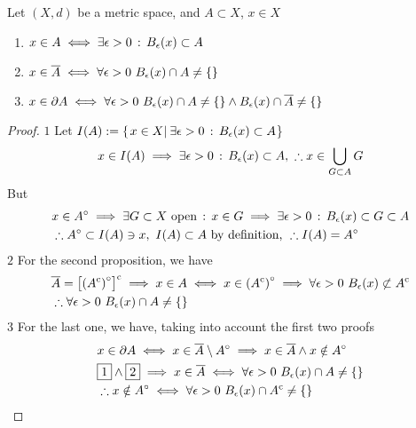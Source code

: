 \documentclass[../complete.tex]{subfiles}
\begin{document}
\begin{prop}
	Let $(X,d)$ be a metric space, and $A\subset X$, $x\in X$
	\begin{enumerate}
	\item $x\in A\iff\exists\epsilon>0\, :\,  B_\epsilon(x)\subset A$
	\item $x\in\cc{A}\iff\forall\epsilon>0\ B_\epsilon(x)\cap A\ne\{\}$
	\item $x\in\partial A\iff\forall\epsilon>0\ B_\epsilon(x)\cap A\ne\{\}\wedge B_\epsilon(x)\cap\overline{A}\ne\{\}$
	\end{enumerate}
\end{prop}
\begin{proof}
		$\boxed{1}$ Let $I(A):=\{\left.x\in X\right|_{}\exists\epsilon>0\, :\,  B_\epsilon(x)\subset A$\}\\
		\begin{equation*}
			x\in I(A)\implies\exists\epsilon>0\, :\,  B_\epsilon(x)\subset A,\ \therefore x\in\bigcup_{G\subset A}G
		\end{equation*}
		But
		\begin{equation*}
			\begin{aligned}
				&x\in A^{\circ}\implies\exists G\subset X\text{ open}\, :\,  x\in G\implies\exists\epsilon>0\, :\,  B_\epsilon(x)\subset G\subset A\\
				&\therefore A^{\circ}\subset I(A)\ni x,\ I(A)\subset A\text{ by definition, }\therefore I(A)=A^{\circ}
			\end{aligned}
		\end{equation*}
		$\boxed{2}$ For the second proposition, we have
		\begin{equation*}
			\begin{aligned}
				&\overline{A}=\left[ \left( A^{\mathrm{c}} \right)^{\circ} \right]^{\mathrm{c}}\implies x\in A\iff x\in\left( A^{\mathrm{c}} \right)^{\circ}\implies\forall\epsilon>0\ B_\epsilon(x)\not\subset A^{\mathrm{c}}\\
				&\therefore\forall\epsilon>0\ B_\epsilon(x)\cap A\ne\{\}
			\end{aligned}
		\end{equation*}
		$\boxed{3}$ For the last one, we have, taking into account the first two proofs
		\begin{equation*}
			\begin{aligned}
				&x\in\partial A\iff x\in\cc{A}\setminus\intr{A}\implies x\in\cc{A}\wedge x\notin\intr{A}\\
				&\boxed{1}\wedge\boxed{2}\implies x\in\cc{A}\iff\forall\epsilon>0\ B_\epsilon(x)\cap A\ne\{\}\\
				&\therefore x\notin\intr{A}\iff\forall\epsilon>0\ B_\epsilon(x)\cap\comp{A}\ne\{\}
			\end{aligned}
		\end{equation*}
\end{proof}
\end{document}
